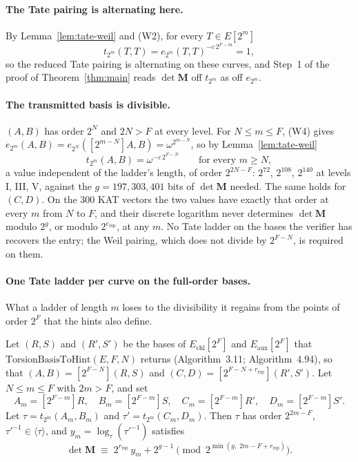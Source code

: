 \documentclass[version=preprint,notanonymous]{iacrcc}
\newcommand{\ers}{e_{\mathrm{rsp}}}
\newcommand{\rrs}{r_{\mathrm{rsp}}}
\newcommand{\Mm}{\mathbf{M}}
\begin{document}
\paragraph{The Tate pairing is alternating here.}
By Lemma~\ref{lem:tate-weil} and (W2), for every $T \in E[2^m]$
\[
  t_{2^m}(T, T) = e_{2^m}(T, T)^{-c\, 2^{F - m}} = 1,
\]
so the reduced Tate pairing is alternating on these curves, and Step~1
of the proof of Theorem~\ref{thm:main} reads $\det \Mm$ off $t_{2^m}$ as
off $e_{2^m}$.

\paragraph{The transmitted basis is divisible.}
$(A, B)$ has order $2^N$ and $2 N > F$ at every level. For $N \le m \le
F$, (W4) gives $e_{2^m}(A, B) = e_{2^N}([2^{m - N}] A, B) = \omega^{2^{m -
N}}$, so by Lemma~\ref{lem:tate-weil}
\[
  t_{2^m}(A, B) = \omega^{-c\, 2^{F - N}} \qquad \text{for every } m \ge N,
\]
a value independent of the ladder's length, of order $2^{2N - F}$: $2^{72}$,
$2^{108}$, $2^{140}$ at levels I, III, V, against the $g = 197, 303, 401$
bits of $\det \Mm$ needed. The same holds for $(C, D)$. On the 300 KAT
vectors the two values have exactly that order at every $m$ from $N$ to
$F$, and their discrete logarithm never determines $\det \Mm$ modulo
$2^g$, or modulo $2^{\ers}$, at any $m$. No Tate ladder on the bases the
verifier has recovers the entry; the Weil pairing, which does not
divide by $2^{F - N}$, is required on them.

\paragraph{One Tate ladder per curve on the full-order bases.}
What a ladder of length $m$ loses to the divisibility it regains from
the points of order $2^F$ that the hints also define.

\begin{proposition}\label{prop:tate}
Let $(R,S)$ and $(R',S')$ be the bases of $E_{\mathrm{chl}}[2^F]$ and
$E_{\mathrm{aux}}[2^F]$ that $\mathrm{TorsionBasisToHint}(E, F, N)$
returns (Algorithm~3.11; Algorithm~4.94), so that $(A, B) = [2^{F - N}]
(R, S)$ and $(C, D) = [2^{F - N + \rrs}] (R', S')$. Let $N \le m \le F$
with $2m > F$, and set
\[
  A_m = [2^{F-m}]R,\quad B_m = [2^{F-m}]S,\quad
  C_m = [2^{F-m}]R',\quad D_m = [2^{F-m}]S'.
\]
Let $\tau = t_{2^m}(A_m, B_m)$ and $\tau' = t_{2^m}(C_m, D_m)$. Then $\tau$ has order
$2^{2m-F}$, $\tau'^{-1} \in \langle \tau \rangle$, and $y_m = \log_\tau(\tau'^{-1})$ satisfies
\[
  \det \Mm \;\equiv\; 2^{\rrs}\, y_m + 2^{g - 1} \pmod{2^{\min(g,\; 2m - F + \rrs)}} .
\]
\end{proposition}
\end{document}
